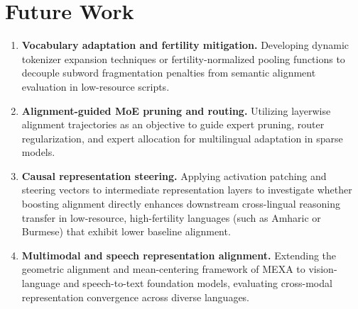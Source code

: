 \section{Future Work}
\label{sec:conclusion-future-work}

\begin{enumerate}
    \item \textbf{Vocabulary adaptation and fertility mitigation.} Developing dynamic tokenizer expansion techniques or fertility-normalized pooling functions to decouple subword fragmentation penalties from semantic alignment evaluation in low-resource scripts.
    
    \item \textbf{Alignment-guided MoE pruning and routing.} Utilizing layerwise alignment trajectories as an objective to guide expert pruning, router regularization, and expert allocation for multilingual adaptation in sparse models.
    
    \item \textbf{Causal representation steering.} Applying activation patching and steering vectors \citep{meng2022locating, zou2023representation, wendler2024llamas} to intermediate representation layers to investigate whether boosting alignment directly enhances downstream cross-lingual reasoning transfer in low-resource, high-fertility languages (such as Amharic or Burmese) that exhibit lower baseline alignment.
    
    \item \textbf{Multimodal and speech representation alignment.} Extending the geometric alignment and mean-centering framework of MEXA to vision-language and speech-to-text foundation models, evaluating cross-modal representation convergence across diverse languages.
\end{enumerate}

